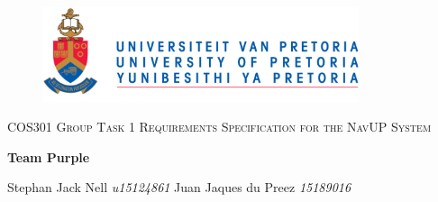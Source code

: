 \begin{titlepage}
	\begin{center}
		\begin{figure}[t]
			\centering
			\includegraphics[width=350px]{UP_Logo.png}
		\end{figure}
		
		\textsc{\LARGE COS301 Group Task 1 \newline\newline Requirements Specification for the NavUP System}
		
		\textbf{\newline Team Purple} \\
		\begin{flushright} \large
			Stephan Jack Nell \emph{u15124861} \newline
			Juan Jaques du Preez \emph{15189016} \newline
		\end{flushright}
		
		\vfill		
	\end{center}
\end{titlepage}